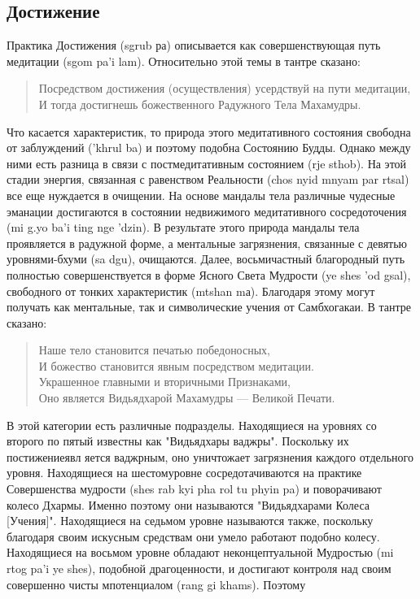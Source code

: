 \subsection{Достижение}
Практика Достижения (sgrub ра) описывается как совершенствующая путь медитации
(sgom pa'i lam). Относительно этой темы в тантре сказано:
\begin{verse}
Посредством достижения (осуществления) усердствуй на пути медитации,\\
И тогда достигнешь божественного Радужного Тела Махамудры.
\end{verse}
Что касается характеристик, то природа этого медитативного состояния свободна от
заблуждений ('khrul ba) и поэтому подобна Состоянию Будды. Однако между ними есть
разница в связи с постмедитативным состоянием (rje sthob). На этой стадии энергия,
связанная с равенством Реальности (chos nyid mnyam par rtsal) все еще нуждается в
очищении. На основе мандалы тела различные чудесные эманации достигаются в состоянии
недвижимого медитативного сосредоточения (mi g.yo ba'i ting nge 'dzin). В результате этого
природа мандалы тела проявляется в радужной форме, а ментальные загрязнения, связанные
с девятью уровнями-бхуми (sa dgu), очищаются. Далее, восьмичастный благородный путь
полностью совершенствуется в форме Ясного Света Мудрости (ye shes 'od gsal), свободного
от тонких характеристик (mtshan mа). Благодаря этому могут получать как ментальные, так и
символические учения от Самбхогакаи. В тантре сказано:
\begin{verse}
Наше тело становится печатью победоносных,\\
И божество становится явным посредством медитации.\\
Украшенное главными и вторичными Признаками,\\
Оно является Видьядхарой Махамудры — Великой Печати.
\end{verse}
В этой категории есть различные подразделы. Находящиеся на уровнях со второго по
пятый известны как "Видьядхары ваджры". Поскольку их постижениеявл яется ваджрным,
оно уничтожает загрязнения каждого отдельного уровня. Находящиеся на шестомуровне
сосредотачиваются на практике Совершенства мудрости (shes rab kyi pha rol tu phyin pa) и
поворачивают колесо Дхармы. Именно поэтому они называются "Видьядхарами Колеса
[Учения]". Находящиеся на седьмом уровне называются также, поскольку благодаря своим
искусным средствам они умело работают подобно колесу. Находящиеся на восьмом уровне
обладают неконцептуальной Мудростью (mi rtog pa'i ye shes), подобной драгоценности, и
достигают контроля над своим совершенно чисты мпотенциалом (rang gi khams). Поэтому
